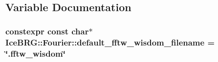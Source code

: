 \subsection{Variable Documentation}
\hypertarget{namespaceIceBRG_1_1Fourier_a6ebd3b65a33ddde6362840e1dd67866b}{}
\subsubsection[{default\+\_\+fftw\+\_\+wisdom\+\_\+filename}]{\setlength{\rightskip}{0pt plus 5cm}constexpr const char$\ast$ Ice\+B\+R\+G\+::\+Fourier\+::default\+\_\+fftw\+\_\+wisdom\+\_\+filename = \char`\"{}.fftw\+\_\+wisdom\char`\"{}}\label{namespaceIceBRG_1_1Fourier_a6ebd3b65a33ddde6362840e1dd67866b}
